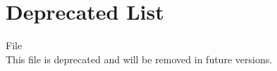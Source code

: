 \chapter{Deprecated List}
\hypertarget{deprecated}{}\label{deprecated}

\begin{DoxyRefList}
\item[File \doxylink{menu_8c}{menu.c} ]\hfill \\
\label{deprecated__deprecated000001}%
%
This file is deprecated and will be removed in future versions. 
\end{DoxyRefList}